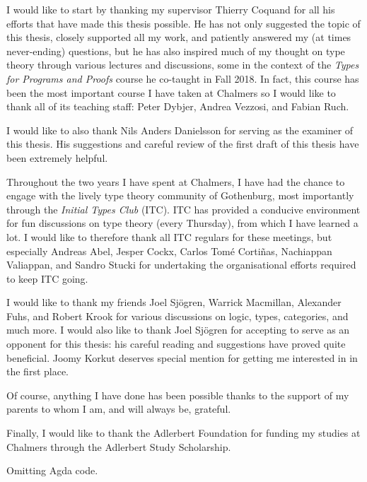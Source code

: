 \begin{acknowledgements}
  I would like to start by thanking my supervisor Thierry Coquand for all his efforts that
  have made this thesis possible. He has not only suggested the topic of this thesis,
  closely supported all my work, and patiently answered my (at times never-ending)
  questions, but he has also inspired much of my thought on type theory through various
  lectures and discussions, some in the context of the \emph{Types for Programs and
  Proofs} course he co-taught in Fall 2018. In fact, this course has been the most
  important course I have taken at Chalmers so I would like to thank all of its teaching
  staff: Peter Dybjer, Andrea Vezzosi, and Fabian Ruch.

  I would like to also thank Nils Anders Danielsson for serving as the examiner of this
  thesis. His suggestions and careful review of the first draft of this thesis have been
  extremely helpful.

  Throughout the two years I have spent at Chalmers, I have had the chance to engage with
  the lively type theory community of Gothenburg, most importantly through
  the \emph{Initial Types Club} (ITC). ITC has provided a conducive environment for fun
  discussions on type theory (every Thursday), from which I have learned a lot. I would
  like to therefore thank all ITC regulars for these meetings, but especially Andreas
  Abel, Jesper Cockx, Carlos Tomé Cortiñas, Nachiappan Valiappan, and Sandro Stucki for
  undertaking the organisational efforts required to keep ITC going.

  I would like to thank my friends Joel Sjögren, Warrick Macmillan, Alexander Fuhs, and
  Robert Krook for various discussions on logic, types, categories, and much more. I would
  also like to thank Joel Sjögren for accepting to serve as an opponent for this thesis:
  his careful reading and suggestions have proved quite beneficial. Joomy Korkut deserves
  special mention for getting me interested in \veragda{} in the first place.

  Of course, anything I have done has been possible thanks to the support of my parents to
  whom I am, and will always be, grateful.

  Finally, I would like to thank the Adlerbert Foundation for funding my studies at
  Chalmers through the Adlerbert Study Scholarship.
\end{acknowledgements}

\makelists{}













\makebackmatter{}

\ifdefined\omitagdainappendix
  Omitting Agda code.
\else

\fi


